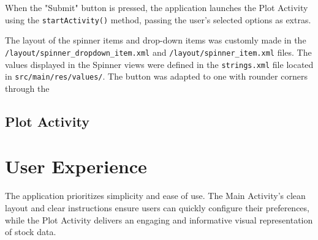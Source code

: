 \documentclass{article}
\begin{document}
When the "Submit" button is pressed, the application launches the Plot Activity using the \texttt{startActivity()} method, passing the user's selected options as extras.

The layout of the spinner items and drop-down items was customly made in the \texttt{/layout/spinner\_dropdown\_item.xml} and \texttt{/layout/spinner\_item.xml} files. 
The values displayed in the Spinner views were defined in the \texttt{strings.xml} file located in \texttt{src/main/res/values/}. The button was adapted to one with rounder corners through the 


\subsection{Plot Activity}

\section{User Experience}
The application prioritizes simplicity and ease of use. The Main Activity's clean layout and clear instructions ensure users can quickly configure their preferences, while the Plot Activity delivers an engaging and informative visual representation of stock data.
\end{document}
